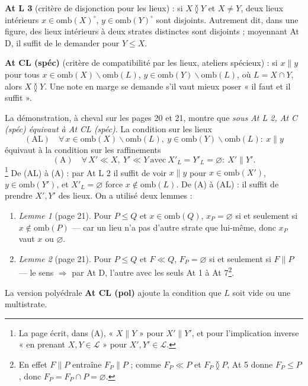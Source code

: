 \documentclass[11pt,a4paper]{article}
\begin{document}
\textbf{At L 3} (critère de disjonction pour les lieux) : si $X \between Y$ et $X
\neq Y$, deux lieux intérieurs $x \in \mathrm{omb}(X)^{\circ}$, $y \in
\mathrm{omb}(Y)^{\circ}$ sont disjoints. Autrement dit, dans une figure, des lieux
intérieurs à deux strates distinctes sont disjoints ; moyennant At D, il suffit
de le demander pour $Y \leq X$.

\textbf{At CL (spéc)} (critère de compatibilité par les lieux, ateliers
spécieux) : si $x \parallel y$ pour tous $x \in \mathrm{omb}(X) \smallsetminus
\mathrm{omb}(L)$, $y \in \mathrm{omb}(Y) \smallsetminus \mathrm{omb}(L)$, où $L = X
\cap Y$, alors $X \between Y$. Une note en marge se demande s'il vaut mieux poser
« il faut et il suffit ».

La démonstration, à cheval sur les pages 20 et 21, montre que \emph{sous At L 2,
At C (spéc) équivaut à At CL (spéc)}. La condition sur les lieux
\[
(\mathrm{AL}) \quad \forall\, x \in \mathrm{omb}(X) \smallsetminus
\mathrm{omb}(L),\ y \in \mathrm{omb}(Y) \smallsetminus \mathrm{omb}(L) :\ x
\parallel y
\]
équivaut à la condition sur les raffinements
\[
(\mathrm{A}) \quad \forall\, X' \ll X,\ Y' \ll Y \ \text{avec}\ X'_{L} = Y'_{L} =
\varnothing :\ X' \parallel Y' .
\]
\footnote{La page écrit, dans (A), « $X \parallel Y$ » pour $X' \parallel Y'$, et
pour l'implication inverse « en prenant $X, Y \in \mathcal{L}$ » pour $X', Y' \in
\mathcal{L}$.}
De (AL) à (A) : par At L 2 il suffit de voir $x \parallel y$ pour $x \in
\mathrm{omb}(X')$, $y \in \mathrm{omb}(Y')$, et $X'_{L} = \varnothing$ force $x
\notin \mathrm{omb}(L)$. De (A) à (AL) : il suffit de prendre $X', Y'$ des lieux.
On a utilisé deux lemmes :
\begin{enumerate}
\item[] \emph{Lemme 1} (page 21). Pour $P \leq Q$ et $x \in \mathrm{omb}(Q)$, $x_{P}
= \varnothing$ si et seulement si $x \notin \mathrm{omb}(P)$ --- car un lieu
n'a pas d'autre strate que lui-même, donc $x_{P}$ vaut $x$ ou $\varnothing$.
\item[] \emph{Lemme 2} (page 21). Pour $P \leq Q$ et $F \ll Q$, $F_{P} = \varnothing$
si et seulement si $F \parallel P$ --- le sens $\Rightarrow$ par At D, l'autre
avec les seuls At 1 à At 7\footnote{En effet $F \parallel P$ entraîne $F_{P}
\parallel P$ ; comme $F_{P} \ll P$ et $F_{P} \between P$, At 5 donne $F_{P} \leq P$,
donc $F_{P} = F_{P} \cap P = \varnothing$.}.
\end{enumerate}
La version polyédrale \textbf{At CL (pol)} ajoute la condition que $L$ soit vide
ou une multistrate.
\end{document}
